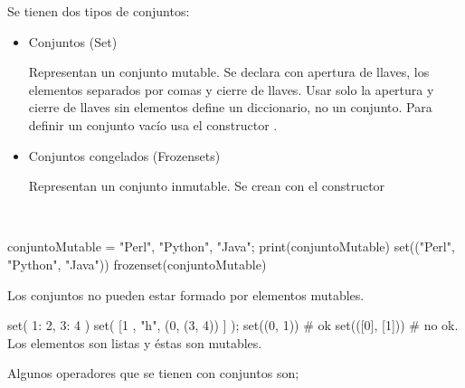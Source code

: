 Se tienen dos tipos de conjuntos:

\begin{itemize}
\item Conjuntos (Set)

Representan un conjunto mutable. Se declara con apertura de llaves, los elementos separados por comas y cierre de llaves. Usar solo la apertura y cierre de llaves sin elementos define un diccionario, no un conjunto. Para definir un conjunto vacío usa el constructor . 

\item Conjuntos congelados (Frozensets)

Representan un conjunto inmutable. Se crean con el constructor 
\end{itemize}

\

\begin{example}{}
\begin{pyconsole}[][frame=single]
conjuntoMutable = {"Perl", "Python", "Java"}; print(conjuntoMutable)
set(("Perl", "Python", "Java"))
frozenset(conjuntoMutable)
\end{pyconsole}
\end{example}

\begin{note}
Los conjuntos no pueden estar formado por elementos mutables.
\end{note}

\begin{pyconsole}[][frame=single]
set( {1: 2, 3: 4} ) 
set( [1  , "h", (0, (3, 4)) ] ); set((0, 1)) # ok
set(([0], [1])) # no ok. Los elementos son listas y éstas son mutables.
\end{pyconsole}

Algunos operadores que se tienen con conjuntos son;

